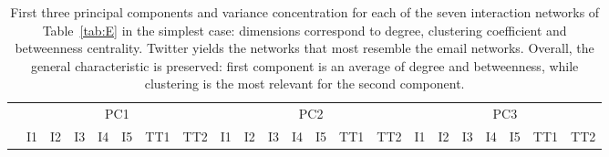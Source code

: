 \documentclass[%
	aip,
	jmp,%
	amsmath,amssymb,
	reprint,%
	floatfix,
]{revtex4-1}
\begin{document}
								\begin{table}[!h]
									\caption{First three principal components and variance concentration for each of the seven interaction networks of Table~\ref{tab:E} in the simplest case: dimensions correspond to degree, clustering coefficient and betweenness centrality. Twitter yields the networks that most resemble the email networks. Overall, the general characteristic is preserved: first component is an average of degree and betweenness, while clustering is the most relevant for the second component.}
									\footnotesize
									\begin{center}
										\begin{tabular}{| l ||  c |c |c |c |c | c | c || c | c | c | c | c | c | c || c |c |c |c |c | c | c |	}\cline{2-22}
											\multicolumn{1}{c|}{} & \multicolumn{7}{c||}{PC1}          & \multicolumn{7}{c||}{PC2} & \multicolumn{7}{c|}{PC3}  \\\cline{2-22}
											\multicolumn{1}{c|}{} & 
											I1 & I2 & I3 & I4 & I5 & TT1 & TT2 &
											I1 & I2 & I3 & I4 & I5 & TT1 & TT2 &
											I1 & I2 & I3 & I4 & I5 & TT1 & TT2 \\\hline
											
											\hline
										\end{tabular}
									\end{center}
									\label{tab:pcaE1I}
								\end{table}
\end{document}
